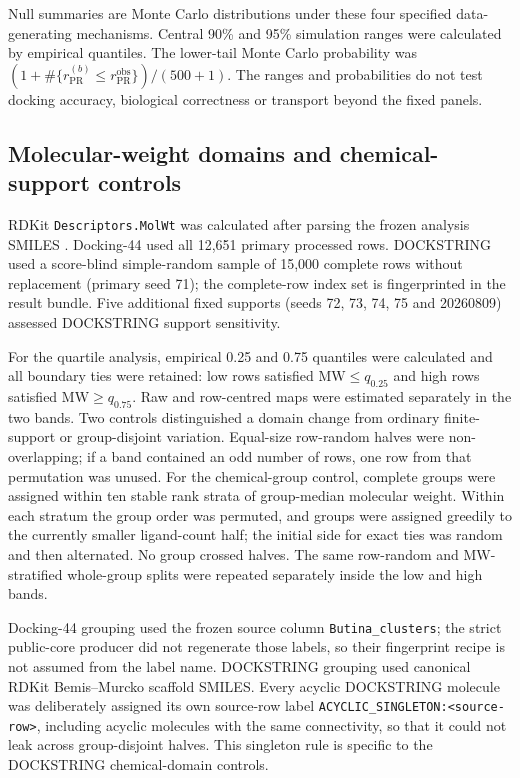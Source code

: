 Null summaries are Monte Carlo distributions under these four specified data-
generating mechanisms.  Central 90\% and 95\% simulation ranges were calculated
by empirical quantiles.  The lower-tail Monte Carlo probability was
$(1+\#\{r_{\mathrm{PR}}^{(b)}\leq r_{\mathrm{PR}}^{\mathrm{obs}}\})/(500+1)$.
The ranges and probabilities do not test docking accuracy, biological
correctness or transport beyond the fixed panels.

\subsection{Molecular-weight domains and chemical-support controls}

RDKit \texttt{Descriptors.MolWt} was calculated after parsing the frozen
analysis SMILES \cite{rdkit2025}.  Docking-44 used all 12,651 primary processed
rows.  DOCKSTRING used a score-blind simple-random sample of 15,000 complete
rows without replacement (primary seed 71); the complete-row index set is
fingerprinted in the result bundle.  Five additional fixed supports (seeds 72,
73, 74, 75 and 20260809) assessed DOCKSTRING support sensitivity.

For the quartile analysis, empirical 0.25 and 0.75 quantiles were calculated and
all boundary ties were retained: low rows satisfied
$\mathrm{MW}\leq q_{0.25}$ and high rows satisfied
$\mathrm{MW}\geq q_{0.75}$.  Raw and row-centred maps were estimated separately
in the two bands.  Two controls distinguished a domain change from ordinary
finite-support or group-disjoint variation.  Equal-size row-random halves were
non-overlapping; if a band contained an odd number of rows, one row from that
permutation was unused.  For the chemical-group control, complete groups were
assigned
within ten stable rank strata of group-median molecular weight.  Within each
stratum the group order was permuted, and groups were assigned greedily to the
currently smaller ligand-count half; the initial side for exact ties was random
and then alternated.  No group crossed halves.  The same row-random and
MW-stratified whole-group splits were repeated separately inside the low and
high bands.

Docking-44 grouping used the frozen source column
\texttt{Butina\_clusters}; the strict public-core producer did not regenerate
those labels, so their fingerprint recipe is not assumed from the label name.
DOCKSTRING grouping used canonical RDKit Bemis--Murcko scaffold SMILES.  Every
acyclic DOCKSTRING molecule was deliberately assigned its own source-row label
\texttt{ACYCLIC\_SINGLETON:<source-row>}, including acyclic molecules with the
same connectivity, so that it could not leak across group-disjoint halves.
This singleton rule is specific to the DOCKSTRING chemical-domain controls.

